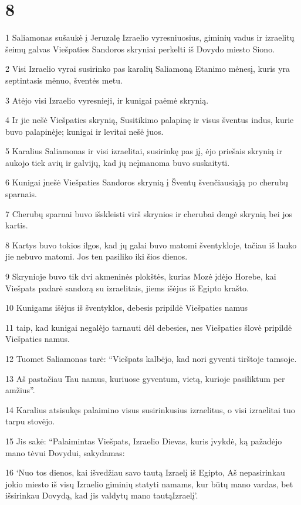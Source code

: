 \chapter{8}

\par 1 Saliamonas sušaukė į Jeruzalę Izraelio vyresniuosius, giminių vadus ir izraelitų šeimų galvas Viešpaties Sandoros skryniai perkelti iš Dovydo miesto Siono. 
\par 2 Visi Izraelio vyrai susirinko pas karalių Saliamoną Etanimo mėnesį, kuris yra septintasis mėnuo, šventės metu. 
\par 3 Atėjo visi Izraelio vyresnieji, ir kunigai paėmė skrynią. 
\par 4 Ir jie nešė Viešpaties skrynią, Susitikimo palapinę ir visus šventus indus, kurie buvo palapinėje; kunigai ir levitai nešė juos. 
\par 5 Karalius Saliamonas ir visi izraelitai, susirinkę pas jį, ėjo priešais skrynią ir aukojo tiek avių ir galvijų, kad jų neįmanoma buvo suskaityti. 
\par 6 Kunigai įnešė Viešpaties Sandoros skrynią į Šventų švenčiausiąją po cherubų sparnais. 
\par 7 Cherubų sparnai buvo išskleisti virš skrynios ir cherubai dengė skrynią bei jos kartis. 
\par 8 Kartys buvo tokios ilgos, kad jų galai buvo matomi šventykloje, tačiau iš lauko jie nebuvo matomi. Jos ten pasiliko iki šios dienos. 
\par 9 Skrynioje buvo tik dvi akmeninės plokštės, kurias Mozė įdėjo Horebe, kai Viešpats padarė sandorą su izraelitais, jiems išėjus iš Egipto krašto. 
\par 10 Kunigams išėjus iš šventyklos, debesis pripildė Viešpaties namus 
\par 11 taip, kad kunigai negalėjo tarnauti dėl debesies, nes Viešpaties šlovė pripildė Viešpaties namus. 
\par 12 Tuomet Saliamonas tarė: “Viešpats kalbėjo, kad nori gyventi tirštoje tamsoje. 
\par 13 Aš pastačiau Tau namus, kuriuose gyventum, vietą, kurioje pasiliktum per amžius”. 
\par 14 Karalius atsisukęs palaimino visus susirinkusius izraelitus, o visi izraelitai tuo tarpu stovėjo. 
\par 15 Jis sakė: “Palaimintas Viešpats, Izraelio Dievas, kuris įvykdė, ką pažadėjo mano tėvui Dovydui, sakydamas: 
\par 16 ‘Nuo tos dienos, kai išvedžiau savo tautą Izraelį iš Egipto, Aš nepasirinkau jokio miesto iš visų Izraelio giminių statyti namams, kur būtų mano vardas, bet išsirinkau Dovydą, kad jis valdytų mano tautą­Izraelį’. 
